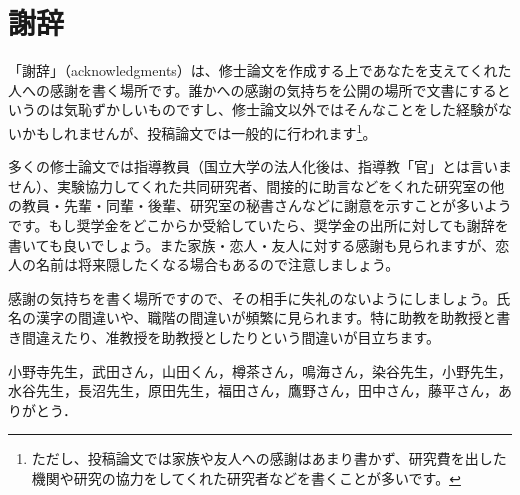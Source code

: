 \chapter*{謝辞}%
%

「謝辞」（acknowledgments）は、修士論文を作成する上であなたを支えてくれた人への感謝を書く場所です。誰かへの感謝の気持ちを公開の場所で文書にするというのは気恥ずかしいものですし、修士論文以外ではそんなことをした経験がないかもしれませんが、投稿論文では一般的に行われます\footnote{ただし、投稿論文では家族や友人への感謝はあまり書かず、研究費を出した機関や研究の協力をしてくれた研究者などを書くことが多いです。}。

多くの修士論文では指導教員（国立大学の法人化後は、指導教「官」とは言いません）、実験協力してくれた共同研究者、間接的に助言などをくれた研究室の他の教員・先輩・同輩・後輩、研究室の秘書さんなどに謝意を示すことが多いようです。もし奨学金をどこからか受給していたら、奨学金の出所に対しても謝辞を書いても良いでしょう。また家族・恋人・友人に対する感謝も見られますが、恋人の名前は将来隠したくなる場合もあるので注意しましょう。

感謝の気持ちを書く場所ですので、その相手に失礼のないようにしましょう。氏名の漢字の間違いや、職階の間違いが頻繁に見られます。特に助教を助教授と書き間違えたり、准教授を助教授としたりという間違いが目立ちます。


小野寺先生，武田さん，山田くん，樽茶さん，鳴海さん，染谷先生，小野先生，水谷先生，長沼先生，原田先生，福田さん，鷹野さん，田中さん，藤平さん，ありがとう．

